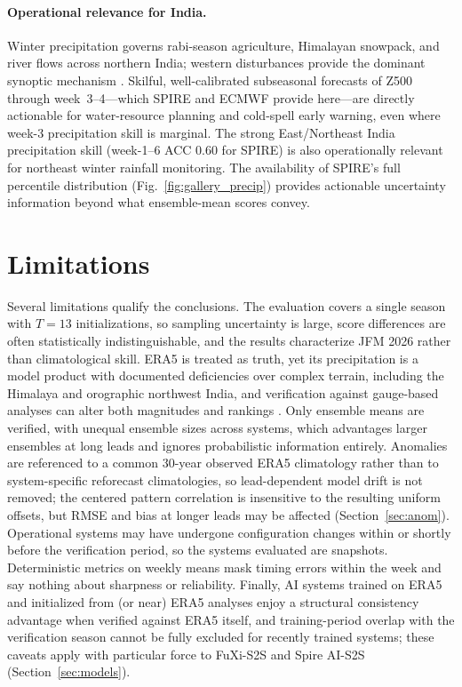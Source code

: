 \documentclass[11pt]{article}
\begin{document}
\paragraph{Operational relevance for India.}
Winter precipitation governs rabi-season agriculture, Himalayan
snowpack, and river flows across northern India; western disturbances
provide the dominant synoptic mechanism
\citep{dimri2015,hunt2018,rao2019}. Skilful, well-calibrated subseasonal
forecasts of Z500 through week~3--4---which SPIRE and ECMWF provide
here---are directly actionable for water-resource planning and
cold-spell early warning, even where week-3 precipitation skill is
marginal. The strong East/Northeast India precipitation skill
(week-1--6 ACC 0.60 for SPIRE) is also operationally relevant for
northeast winter rainfall monitoring. The availability of SPIRE's full
percentile distribution (Fig.~\ref{fig:gallery_precip}) provides
actionable uncertainty information beyond what ensemble-mean scores
convey.

\section{Limitations}\label{sec:limitations}

Several limitations qualify the conclusions. The evaluation covers a
single season with $T=13$ initializations, so sampling uncertainty is
large, score differences are often statistically indistinguishable,
and the results characterize JFM 2026 rather than climatological
skill. ERA5 is treated as truth, yet its precipitation is a model
product with documented deficiencies over complex terrain, including
the Himalaya and orographic northwest India, and verification against
gauge-based analyses can alter both magnitudes and rankings
\citep{hersbach2020,pai2014}. Only ensemble means are verified, with
unequal ensemble sizes across systems, which advantages larger
ensembles at long leads and ignores probabilistic information
entirely. Anomalies are referenced to a common 30-year observed ERA5
climatology rather than to system-specific reforecast climatologies, so
lead-dependent model drift is not removed; the centered pattern
correlation is insensitive to the resulting uniform offsets, but RMSE
and bias at longer leads may be affected (Section~\ref{sec:anom}).
Operational systems may have undergone
configuration changes within or shortly before the verification
period, so the systems evaluated are snapshots. Deterministic metrics
on weekly means mask timing errors within the week and say nothing
about sharpness or reliability. Finally, AI systems trained on ERA5
and initialized from (or near) ERA5 analyses enjoy a structural
consistency advantage when verified against ERA5 itself, and
training-period overlap with the verification season cannot be fully
excluded for recently trained systems; these caveats apply with
particular force to FuXi-S2S and Spire AI-S2S
(Section~\ref{sec:models}).
\end{document}
